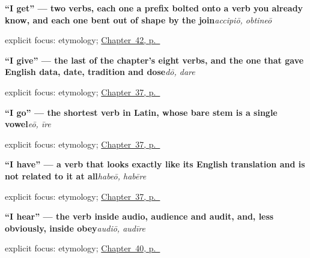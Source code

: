 \noindent\begin{minipage}[t]{\linewidth}
\raggedright
\textbf{\textquotedblleft{}I get\textquotedblright{} — two verbs, each one a prefix bolted onto a verb you already know, and each one bent out of shape by the join}\enspace\emph{accipiō, obtineō}\par
\footnotesize explicit focus: etymology; \hyperref[ch:la-getting-and-waiting-verbs]{Chapter~42, p.~\pageref*{ch:la-getting-and-waiting-verbs}}
\end{minipage}\par\smallskip

\noindent\begin{minipage}[t]{\linewidth}
\raggedright
\textbf{\textquotedblleft{}I give\textquotedblright{} — the last of the chapter's eight verbs, and the one that gave English data, date, tradition and dose}\enspace\emph{dō, dare}\par
\footnotesize explicit focus: etymology; \hyperref[ch:la-core-verbs]{Chapter~37, p.~\pageref*{ch:la-core-verbs}}
\end{minipage}\par\smallskip

\noindent\begin{minipage}[t]{\linewidth}
\raggedright
\textbf{\textquotedblleft{}I go\textquotedblright{} — the shortest verb in Latin, whose bare stem is a single vowel}\enspace\emph{eō, īre}\par
\footnotesize explicit focus: etymology; \hyperref[ch:la-core-verbs]{Chapter~37, p.~\pageref*{ch:la-core-verbs}}
\end{minipage}\par\smallskip

\noindent\begin{minipage}[t]{\linewidth}
\raggedright
\textbf{\textquotedblleft{}I have\textquotedblright{} — a verb that looks exactly like its English translation and is not related to it at all}\enspace\emph{habeō, habēre}\par
\footnotesize explicit focus: etymology; \hyperref[ch:la-core-verbs]{Chapter~37, p.~\pageref*{ch:la-core-verbs}}
\end{minipage}\par\smallskip

\noindent\begin{minipage}[t]{\linewidth}
\raggedright
\textbf{\textquotedblleft{}I hear\textquotedblright{} — the verb inside audio, audience and audit, and, less obviously, inside obey}\enspace\emph{audiō, audīre}\par
\footnotesize explicit focus: etymology; \hyperref[ch:la-sense-and-posture-verbs]{Chapter~40, p.~\pageref*{ch:la-sense-and-posture-verbs}}
\end{minipage}\par\smallskip

